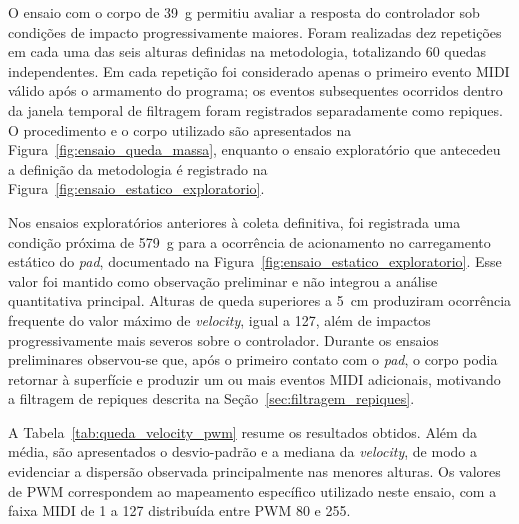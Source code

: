 O ensaio com o corpo de 39~g permitiu avaliar a resposta do controlador sob condições de impacto progressivamente maiores. Foram realizadas dez repetições em cada uma das seis alturas definidas na metodologia, totalizando 60 quedas independentes. Em cada repetição foi considerado apenas o primeiro evento MIDI válido após o armamento do programa; os eventos subsequentes ocorridos dentro da janela temporal de filtragem foram registrados separadamente como repiques. O procedimento e o corpo utilizado são apresentados na Figura~\ref{fig:ensaio_queda_massa}, enquanto o ensaio exploratório que antecedeu a definição da metodologia é registrado na Figura~\ref{fig:ensaio_estatico_exploratorio}.

Nos ensaios exploratórios anteriores à coleta definitiva, foi registrada uma condição próxima de 579~g para a ocorrência de acionamento no carregamento estático do \textit{pad}, documentado na Figura~\ref{fig:ensaio_estatico_exploratorio}. Esse valor foi mantido como observação preliminar e não integrou a análise quantitativa principal. Alturas de queda superiores a 5~cm produziram ocorrência frequente do valor máximo de \textit{velocity}, igual a 127, além de impactos progressivamente mais severos sobre o controlador. Durante os ensaios preliminares observou-se que, após o primeiro contato com o \textit{pad}, o corpo podia retornar à superfície e produzir um ou mais eventos MIDI adicionais, motivando a filtragem de repiques descrita na Seção~\ref{sec:filtragem_repiques}.

A Tabela~\ref{tab:queda_velocity_pwm} resume os resultados obtidos. Além da média, são apresentados o desvio-padrão e a mediana da \textit{velocity}, de modo a evidenciar a dispersão observada principalmente nas menores alturas. Os valores de PWM correspondem ao mapeamento específico utilizado neste ensaio, com a faixa MIDI de 1 a 127 distribuída entre PWM 80 e 255.

\begin{table}[!htbp]
\centering
\caption{Resultados do ensaio com corpo de 39~g para diferentes alturas de queda}
\label{tab:queda_velocity_pwm}
\end{table}

